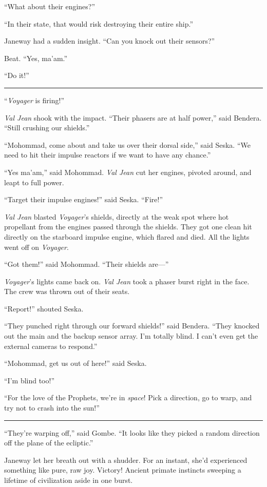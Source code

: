 \documentclass[twoside,letterpaper,12pt]{memoir}
\begin{document}
``What about their engines?''

``In their state, that would risk destroying their entire ship.''

Janeway had a sudden insight. ``Can you knock out their sensors?''

Beat. ``Yes, ma'am.''

``Do it!''

\fancybreak{\rule{3cm}{0.4 pt}}
\noindent``\textit{Voyager} is firing!''

\textit{Val Jean} shook with the impact. ``Their phasers are at half power,'' said Bendera. ``Still crushing our shields.''

``Mohommad, come about and take us over their dorsal side,'' said Seska. ``We need to hit their impulse reactors if we want to have any chance.''

``Yes ma'am,'' said Mohommad. \textit{Val Jean} cut her engines, pivoted around, and leapt to full power.

``Target their impulse engines!'' said Seska. ``Fire!''

\textit{Val Jean} blasted \textit{Voyager}'s shields, directly at the weak spot where hot propellant from the engines passed through the shields. They got one clean hit directly on the starboard impulse engine, which flared and died. All the lights went off on \textit{Voyager}.

``Got them!'' said Mohommad. ``Their shields are---''

\textit{Voyager}'s lights came back on. \textit{Val Jean} took a phaser burst right in the face. The crew was thrown out of their seats.

``Report!'' shouted Seska.

``They punched right through our forward shields!'' said Bendera. ``They knocked out the main and the backup sensor array. I'm totally blind. I can't even get the external cameras to respond.''

``Mohommad, get us out of here!'' said Seska.

``I'm blind too!''

``For the love of the Prophets, we're in \textit{space}! Pick a direction, go to warp, and try not to crash into the sun!''

\fancybreak{\rule{3cm}{0.4 pt}}
\noindent ``They're warping off,'' said Gombe. ``It looks like they picked a random direction off the plane of the ecliptic.''

Janeway let her breath out with a shudder. For an instant, she'd experienced something like pure, raw joy. Victory! Ancient primate instincts sweeping a lifetime of civilization aside in one burst.
\end{document}
